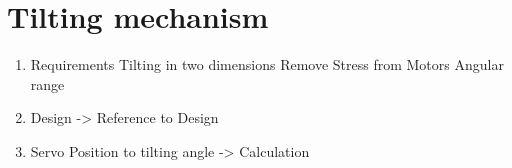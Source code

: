 \section{Tilting mechanism}

\begin{enumerate}
  \item Requirements
  \subitem Tilting in two dimensions
  \subitem Remove Stress from Motors
  \subitem Angular range
  \item Design -> Reference to Design
  \item Servo Position to tilting angle -> Calculation
\end{enumerate}